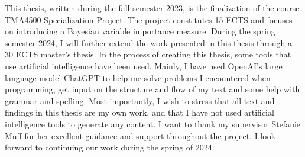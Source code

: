 This thesis, written during the fall semester 2023, is the finalization of the course TMA4500 Specialization Project.
The project constitutes 15 ECTS and focuses on introducing a Bayesian variable importance measure.
During the spring semester 2024, I will further extend the work presented in this thesis through a 30 ECTS master's thesis.
\newline
\newline
In the process of creating this thesis, some tools that use artificial intelligence have been used.
Mainly, I have used OpenAI's large language model ChatGPT to help me solve problems I encountered when programming, get input on the structure and flow of my text and some help with grammar and spelling. 
Most importantly, I wish to stress that all text and findings in this thesis are my own work, and that I have not used artificial intelligence tools to generate any content. 
\newline
\newline
I want to thank my supervisor Stefanie Muff for her excellent guidance and support throughout the project. 
I look forward to continuing our work during the spring of 2024.